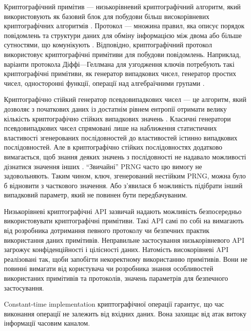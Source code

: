\documentclass{kpi-lab}
\begin{document}
Криптографічний примітив ---
низькорівневий криптографічний алгоритм, який
використовують як базовий
блок для побудови більш високорівневих криптографічних
алгоритмів \cite[NIST][]{Barker_2020}.
Протокол ---
множина правил, яка описує порядок повідомлень та структури
даних для обміну інформацією
між двома або більше сутностями, що комунікують
\cite[NIST][]{Barker_2020}.
Відповідно, криптографічний протокол використовує
криптографічні примітиви для побудови повідомлень.
Наприклад, варіанти протокола Діффі—Геллмана для узгодження ключів
потребують такі криптографічні примітиви, як
генератор випадкових чисел,
генератор простих чисел,
односторонні функції,
операції над алгебраїчними групами \cite[IETF RFC][]{rfc9846}.

Криптографічно стійкий генератор псевдовипадкових чисел ---
це алгоритм, який
дозволяє з початкових даних із достатнім рівнем ентропії
отримати велику кількість криптографічно стійких випадкових
значень \cite[RFC][]{rfc4086}.
Класичні генератори псевдовипадкових чисел спрямовані лише
на наближення статистичних властивості згенерованих послідовностей до
властивостей істинно випадкових послідовностей.
Але в криптографічно стійких послідовностях додатково
вимагається, щоб знання деяких значень з послідовності не
надавало можливості дізнатися значення інших \cite[RFC][]{rfc4086}.
\enquote{Звичайні} PRNG часто цю вимогу не задовольняють.
Таким чином, ключ, згенерований нестійким PRNG, можна було б
відновити з часткового значення.
Або з'явилася б можливість підібрати інший випадковий параметр, який
не повинен бути передбачуваним.

Низькорівневі криптографічні API зазвичай надають
можливість безпосередньо використовувати криптографічні
примітиви. Такі API самі по собі на вимагають від
розробника дотримання певного протоколу чи безпечних
практик використання даних примітивів. Неправильне
застосування низькорівневого API загрожує конфіденційності
і цілісності даних. Натомість високорівневі API реалізовані
так, щоби запобігти некоректному використанню примітивів.
Вони не повинні вимагати від користувача чи розробника
знання особливостей використаних примітивів та протоколів,
значень параметрів для безпечного застосування.

Constant-time implementation криптографічної операції
гарантує, що час виконання операції не залежить від вхідних даних.
Вона захищає від атак витоку інформації часовим каналом.
\end{document}
